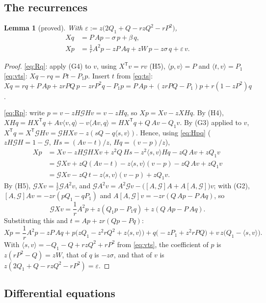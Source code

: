 \documentclass[11pt]{article}
\newtheorem{lemma}[theorem]{Lemma}
\theoremstyle{definition}
\theoremstyle{remark}
\begin{document}
\subsection{The recurrences}

\begin{lemma}[proved]\label{lem:rec}
With $\varepsilon:=z\bigl(2Q_1+Q-rzQ^2-rP^2\bigr)$,
\begin{align}
Xq&=P\,Ap-\sigma\,p+\beta\,q,\tag{Rq}\label{eq:Rq}\\
Xp&=\frac1rA^2p-zP\,Aq+zW\,p-z\sigma\,q+\varepsilon\,v.\tag{Rp}\label{eq:Rp}
\end{align}
\end{lemma}

\begin{proof}
\eqref{eq:Rq}: apply (G4) to $v$, using $X^{\mathsf T}v=rv$ (H5), $\langle p,v\rangle=P$ and $\langle t,v\rangle=P_1$ \eqref{eq:vts}: $Xq-rq=Pt-P_1p$. Insert $t$ from \eqref{eq:ts}: $Xq=rq+P\,Ap+zrPQ\,p-zrP^2q-P_1p=P\,Ap+(zrPQ-P_1)p+r(1-zP^2)q$.

\eqref{eq:Rp}: write $p=v-zH\mathcal GHv=v-zHq$, so $Xp=Xv-zXHq$. By (H4), $XHq=HX^{\mathsf T}q+Av\langle v,q\rangle-v\langle Av,q\rangle=HX^{\mathsf T}q+Q\,Av-Q_1v$. By (G3) applied to $v$, $X^{\mathsf T}q=X^{\mathsf T}\mathcal GHv=\mathcal GHXv-z(sQ-q\langle s,v\rangle)$. Hence, using \eqref{eq:Hpq} ($zH\mathcal GH=1-\mathcal G$, $Hs=(Av-t)/z$, $Hq=(v-p)/z$),
\begin{align*}
Xp&=Xv-zH\mathcal GHXv+z^2Q\,Hs-z^2\langle s,v\rangle Hq-zQ\,Av+zQ_1v\\
&=\mathcal GXv+zQ(Av-t)-z\langle s,v\rangle(v-p)-zQ\,Av+zQ_1v\\
&=\mathcal GXv-zQ\,t-z\langle s,v\rangle(v-p)+zQ_1v .
\end{align*}
By (H5), $\mathcal GXv=\frac1r\mathcal GA^2v$, and $\mathcal GA^2v=A^2\mathcal Gv-\bigl([A,\mathcal G]A+A[A,\mathcal G]\bigr)v$; with (G2), $[A,\mathcal G]Av=-zr(pQ_1-qP_1)$ and $A[A,\mathcal G]v=-zr(Q\,Ap-P\,Aq)$, so
\[
\mathcal GXv=\frac1rA^2p+z(Q_1p-P_1q)+z(Q\,Ap-P\,Aq).
\]
Substituting this and $t=Ap+zr(Qp-Pq)$:
\[
Xp=\frac1rA^2p-zP\,Aq+p\bigl(zQ_1-z^2rQ^2+z\langle s,v\rangle\bigr)+q\bigl(-zP_1+z^2rPQ\bigr)+v\,z\bigl(Q_1-\langle s,v\rangle\bigr).
\]
With $\langle s,v\rangle=-Q_1-Q+rzQ^2+rP^2$ from \eqref{eq:vts}, the coefficient of $p$ is $z(rP^2-Q)=zW$, that of $q$ is $-z\sigma$, and that of $v$ is $z(2Q_1+Q-rzQ^2-rP^2)=\varepsilon$.
\end{proof}

\subsection{Differential equations}
\end{document}
